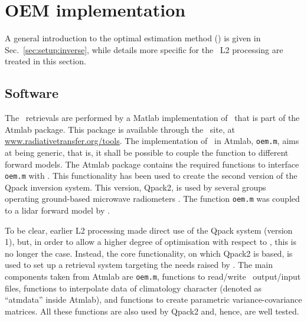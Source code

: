 \chapter{OEM implementation}
\label{chapter:oem}

A general introduction to the optimal estimation method (\OEM) is given in
Sec.~\ref{sec:setup:inverse}, while details more specific for the \smr\ L2
processing are treated in this section.
\\


\section{Software}
\label{sec:oem.m}
%
The \smr\ retrievals are performed by a Matlab implementation of \OEM\ that is
part of the Atmlab package. This package is available through the \ARTS\ site,
at \url{www.radiativetransfer.org/tools}. The implementation of \OEM\ in Atmlab,
\texttt{oem.m}, aims at being generic, that is, it shall be possible to couple
the function to different forward models. The Atmlab package contains the
required functions to interface \texttt{oem.m} with \ARTS. This functionality
has been used to create the second version of the Qpack
\citep{eriksson:qpack:05} inversion system. This version, Qpack2, is used by
several groups operating ground-based microwave radiometers
\citep[e.g.][]{acp-15-5099-2015}. The function \texttt{oem.m} was coupled to a lidar
forward model by \citet{sica2015retrieval}.

To be clear, earlier L2 processing made direct use of the Qpack system (version
1), but, in order to allow a higher degree of optimisation
with respect to \smr, this is no longer the case.
Instead, the core functionality, on which Qpack2 is
based, is used to set up a retrieval system targeting the needs raised by \smr.
The main components taken from Atmlab are \texttt{oem.m}, functions to
read/write \ARTS\ output/input files, functions to interpolate data of
climatology character (denoted as ``atmdata'' inside Atmlab), and functions to
create parametric variance-covariance matrices. All these functions are also
used by Qpack2 and, hence, are well tested.



